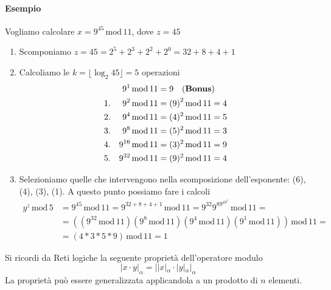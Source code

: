 \paragraph{Esempio} Vogliamo calcolare $x=9^{45}\,\text{mod}\,11$, dove $z=45$
\begin{enumerate}
	\item Scomponiamo $z=45=2^5+2^3+2^2+2^0=32+8+4+1$
	\item Calcoliamo le $k=\lfloor \log_2 45 \rfloor=5$ operazioni
	\begin{align*}
		&&9^1\,\text{mod}\,11&=9\,\,\,\,\,\,(\text{\textbf{Bonus}})\\
		1.&&9^2\,\text{mod}\,11&={(9)}^2\,\text{mod}\,11=4\\
		2.&&9^4\,\text{mod}\,11&=(4)^2\,\text{mod}\,11=5\\
		3.&&9^8\,\text{mod}\,11&=(5)^2\,\text{mod}\,11=3\\
		4.&&9^{16}\,\text{mod}\,11&=(3)^2\,\text{mod}\,11=9\\
		5.&&9^{32}\,\text{mod}\,11&=(9)^2\,\text{mod}\,11=4
	\end{align*}
	\item Selezioniamo quelle che intervengono nella scomposizione dell'esponente: (6), (4), (3), (1). A questo punto possiamo fare i calcoli
	\begin{align*}
		y^z\,\text{mod}\,5&=9^{45}\,\text{mod}\,11=9^{32+8+4+1}\,\text{mod}\,11=9^{32}9^89^49^1\,\text{mod}\,11=\\&=\left(\left(9^{32}\,\text{mod}\,11\right)\left(9^{8}\,\text{mod}\,11\right)\left(9^{4}\,\text{mod}\,11\right)\left(9^{1}\,\text{mod}\,11\right)\right)\,\text{mod}\,11=\\&=(4*3*5*9)\,\text{mod}\,11=1
	\end{align*}
\end{enumerate}
Si ricordi da Reti logiche la seguente proprietà dell'operatore modulo
\[\boxed{|x\cdot y|_\alpha=||x|_\alpha\cdot |y|_\alpha|_\alpha}\]
La proprietà può essere generalizzata applicandola a un prodotto di $n$ elementi.
